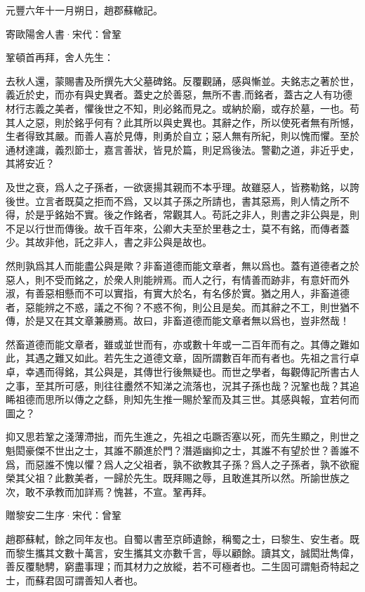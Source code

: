 \documentclass[12pt,a4paper]{ctexbook}
\begin{document}
元豐六年十一月朔日，趙郡蘇轍記。\par
寄歐陽舍人書·宋代：曾鞏 \par
鞏頓首再拜，舍人先生：\par
去秋人還，蒙賜書及所撰先大父墓碑銘。反覆觀誦，感與慚並。夫銘志之著於世，義近於史，而亦有與史異者。蓋史之於善惡，無所不書,而銘者，蓋古之人有功德材行志義之美者，懼後世之不知，則必銘而見之。或納於廟，或存於墓，一也。苟其人之惡，則於銘乎何有？此其所以與史異也。其辭之作，所以使死者無有所憾，生者得致其嚴。而善人喜於見傳，則勇於自立；惡人無有所紀，則以愧而懼。至於通材達識，義烈節士，嘉言善狀，皆見於篇，則足爲後法。警勸之道，非近乎史，其將安近？\par
及世之衰，爲人之子孫者，一欲褒揚其親而不本乎理。故雖惡人，皆務勒銘，以誇後世。立言者既莫之拒而不爲，又以其子孫之所請也，書其惡焉，則人情之所不得，於是乎銘始不實。後之作銘者，常觀其人。苟託之非人，則書之非公與是，則不足以行世而傳後。故千百年來，公卿大夫至於里巷之士，莫不有銘，而傳者蓋少。其故非他，託之非人，書之非公與是故也。\par
然則孰爲其人而能盡公與是歟？非畜道德而能文章者，無以爲也。蓋有道德者之於惡人，則不受而銘之，於衆人則能辨焉。而人之行，有情善而跡非，有意奸而外淑，有善惡相懸而不可以實指，有實大於名，有名侈於實。猶之用人，非畜道德者，惡能辨之不惑，議之不徇？不惑不徇，則公且是矣。而其辭之不工，則世猶不傳，於是又在其文章兼勝焉。故曰，非畜道德而能文章者無以爲也，豈非然哉！\par
然畜道德而能文章者，雖或並世而有，亦或數十年或一二百年而有之。其傳之難如此，其遇之難又如此。若先生之道德文章，固所謂數百年而有者也。先祖之言行卓卓，幸遇而得銘，其公與是，其傳世行後無疑也。而世之學者，每觀傳記所書古人之事，至其所可感，則往往衋然不知涕之流落也，況其子孫也哉？況鞏也哉？其追睎祖德而思所以傳之之繇，則知先生推一賜於鞏而及其三世。其感與報，宜若何而圖之？\par
抑又思若鞏之淺薄滯拙，而先生進之，先祖之屯蹶否塞以死，而先生顯之，則世之魁閎豪傑不世出之士，其誰不願進於門？潛遁幽抑之士，其誰不有望於世？善誰不爲，而惡誰不愧以懼？爲人之父祖者，孰不欲教其子孫？爲人之子孫者，孰不欲寵榮其父祖？此數美者，一歸於先生。既拜賜之辱，且敢進其所以然。所諭世族之次，敢不承教而加詳焉？愧甚，不宣。鞏再拜。\par
贈黎安二生序·宋代：曾鞏 \par
趙郡蘇軾，餘之同年友也。自蜀以書至京師遺餘，稱蜀之士，曰黎生、安生者。既而黎生攜其文數十萬言，安生攜其文亦數千言，辱以顧餘。讀其文，誠閎壯雋偉，善反覆馳騁，窮盡事理；而其材力之放縱，若不可極者也。二生固可謂魁奇特起之士，而蘇君固可謂善知人者也。\par
\end{document}

